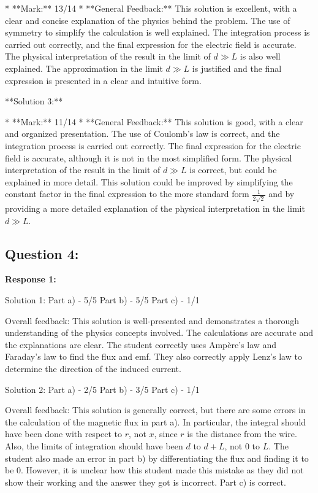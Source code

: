 \documentclass[a4paper,11pt]{article}
\begin{document}
* **Mark:** 13/14
* **General Feedback:** This solution is excellent, with a clear and concise explanation of the physics behind the problem. The use of symmetry to simplify the calculation is well explained. The integration process is carried out correctly, and the final expression for the electric field is accurate. The physical interpretation of the result in the limit of \( d \gg L \) is also well explained. The approximation in the limit \( d \gg L \) is justified and the final expression is presented in a clear and intuitive form. 

**Solution 3:**

* **Mark:** 11/14
* **General Feedback:** This solution is good, with a clear and organized presentation. The use of Coulomb's law is correct, and the integration process is carried out correctly. The final expression for the electric field is accurate, although it is not in the most simplified form. The physical interpretation of the result in the limit of \( d \gg L \) is correct, but could be explained in more detail. This solution could be improved by simplifying the constant factor in the final expression to the more standard form \( \frac{1}{2\sqrt{2}} \) and by providing a more detailed explanation of the physical interpretation in the limit \( d \gg L \). 

\subsection*{Question 4:}

\textbf{Response 1:}

Solution 1:
Part a) - 5/5
Part b) - 5/5
Part c) - 1/1

Overall feedback: This solution is well-presented and demonstrates a thorough understanding of the physics concepts involved. The calculations are accurate and the explanations are clear. The student correctly uses Ampère's law and Faraday's law to find the flux and emf. They also correctly apply Lenz's law to determine the direction of the induced current.

Solution 2:
Part a) - 2/5 
Part b) - 3/5
Part c) - 1/1

Overall feedback: This solution is generally correct, but there are some errors in the calculation of the magnetic flux in part a). In particular, the integral should have been done with respect to \( r \), not \( x \), since \( r \) is the distance from the wire. Also, the limits of integration should have been \( d \) to \( d + L \), not 0 to \( L \). The student also made an error in part b) by differentiating the flux and finding it to be 0. However, it is unclear how this student made this mistake as they did not show their working and the answer they got is incorrect. Part c) is correct.
\end{document}
